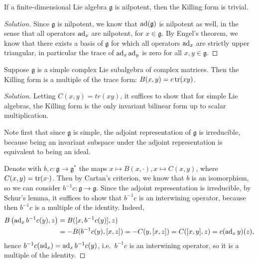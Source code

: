 \documentclass{report}
\begin{document}
\begin{exercise}[Exercise I.12]
    If a finite-dimensional Lie algebra $\mathfrak g$ is nilpotent, then the Killing form is trivial.
\end{exercise}
\begin{proof}[Solution]
    Since $\mathfrak g$ is nilpotent, we know that $\operatorname{ad}(\mathfrak g)$ is nilpotent as well, in the sense that all operators $\operatorname{ad}_x$ are nilpotent, for $x \in \mathfrak g$.
    By Engel's theorem, we know that there exists a basis of $\mathfrak g$ for which all operators $\operatorname{ad}_x$ are strictly upper triangular, in particular the trace of $\operatorname{ad}_x \operatorname{ad}_y$ is zero for all $x,y\in \mathfrak g$.
\end{proof}
\begin{exercise}[Exercise I.13]\label{ex:simple_killing_form}
    Suppose $\mathfrak g$ is a simple complex Lie subalgebra of complex matrices.
    Then the Killing form is a multiple of the trace form: $B(x,y) = c \operatorname{tr}(xy)$.
\end{exercise}
\begin{proof}[Solution]
    Letting $C(x,y) = tr(xy)$, it suffices to show that for simple Lie algebras, the Killing form is the only invariant bilinear form up to scalar multiplication.

    Note first that since $\mathfrak g$ is simple, the adjoint representation of $\mathfrak g$ is irreducible, because being an invariant subspace under the adjoint representation is equivalent to being an ideal.

    Denote with $b,c: \mathfrak g \to \mathfrak g^*$ the maps $x \mapsto B(x, \cdot), x \mapsto C(x,y)$, where $C(x,y) = \operatorname{tr}(x \cdot)$.
    Then by Cartan's criterion, we know that $b$ is an isomorphism, so we can consider $b^{-1}c: \mathfrak g \to \mathfrak g$.
    Since the adjoint representation is irreducible, by Schur's lemma, it suffices to show that $b^{-1}c$ is an interwining operator, because then $b^{-1}c$ is a multiple of the identity.
    Indeed, 
    \begin{align*}
        B\left(\operatorname{ad}_x b^{-1}c(y), z\right) &= B([x, b^{-1}c(y)], z)\\
        &= -B(b^{-1}c(y), [x,z]) = -C(y, [x,z]) = C([x, y], z) = c(\operatorname{ad}_x y)(z),
    \end{align*}
    hence $b^{-1}c(\operatorname{ad}_x) = \operatorname{ad}_x b^{-1}c(y)$, i.e.\ $b^{-1}c$ is an interwining operator, so it is a multiple of the identity.
\end{proof}
\end{document}
